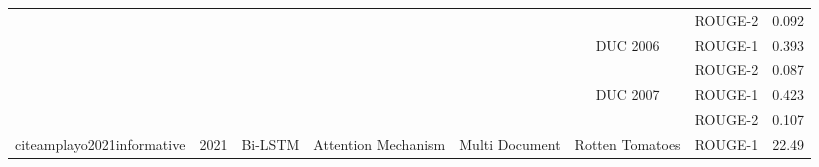 \documentclass[12pt, a4paper, oneside]{report}
\begin{document}
\begin{tabular}{|c|c|c|c|c|c|cc|}
                                                                          &                       &                                   &                                         &                                                                                                        &                                       & \multicolumn{1}{c|}{ROUGE-2}                                                                                                       & 0.092  \\ \cline{6-8} 
                                                                          &                       &                                   &                                         &                                                                                                        & \multirow{2}{*}{DUC 2006}             & \multicolumn{1}{c|}{ROUGE-1}                                                                                                       & 0.393  \\ \cline{7-8} 
                                                                          &                       &                                   &                                         &                                                                                                        &                                       & \multicolumn{1}{c|}{ROUGE-2}                                                                                                       & 0.087  \\ \cline{6-8} 
                                                                          &                       &                                   &                                         &                                                                                                        & \multirow{2}{*}{DUC 2007}             & \multicolumn{1}{c|}{ROUGE-1}                                                                                                       & 0.423  \\ \cline{7-8} 
                                                                          &                       &                                   &                                         &                                                                                                        &                                       & \multicolumn{1}{c|}{ROUGE-2}                                                                                                       & 0.107  \\ \hline
    \multirow{3}{*}{cite{amplayo2021informative}}       & \multirow{3}{*}{2021} & \multirow{3}{*}{Bi-LSTM}          & \multirow{3}{*}{Attention Mechanism}    & \multirow{3}{*}{Multi Document}                                                                        & \multirow{3}{*}{Rotten Tomatoes}      & \multicolumn{1}{c|}{ROUGE-1}                                                                                                       & 22.49  \\ \cline{7-8} 

\end{tabular}
\end{document}
